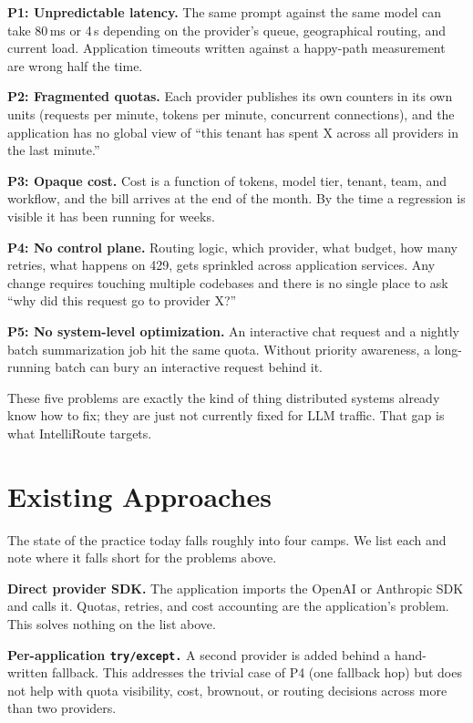 \documentclass[conference,letterpaper]{IEEEtran}
\begin{document}
\textbf{P1: Unpredictable latency.} The same prompt against the same
model can take 80\,ms or 4\,s depending on the provider's queue,
geographical routing, and current load. Application timeouts written
against a happy-path measurement are wrong half the time.

\textbf{P2: Fragmented quotas.} Each provider publishes its own
counters in its own units (requests per minute, tokens per minute,
concurrent connections), and the application has no global view of
``this tenant has spent X across all providers in the last minute.''

\textbf{P3: Opaque cost.} Cost is a function of tokens, model tier,
tenant, team, and workflow, and the bill arrives at the end of the
month. By the time a regression is visible it has been running for
weeks.

\textbf{P4: No control plane.} Routing logic, which provider, what
budget, how many retries, what happens on 429, gets sprinkled
across application services. Any change requires touching multiple
codebases and there is no single place to ask ``why did this
request go to provider X?''

\textbf{P5: No system-level optimization.} An interactive chat
request and a nightly batch summarization job hit the same quota.
Without priority awareness, a long-running batch can bury an
interactive request behind it.

These five problems are exactly the kind of thing distributed
systems already know how to fix; they are just not currently fixed
for LLM traffic. That gap is what IntelliRoute targets.

\section{Existing Approaches}\label{sec:related}
The state of the practice today falls roughly into four camps. We
list each and note where it falls short for the problems above.

\textbf{Direct provider SDK.} The application imports the OpenAI or
Anthropic SDK and calls it. Quotas, retries, and cost accounting are
the application's problem. This solves nothing on the list above.

\textbf{Per-application \texttt{try/except.}} A second provider is
added behind a hand-written fallback. This addresses the trivial case
of P4 (one fallback hop) but does not help with quota visibility,
cost, brownout, or routing decisions across more than two providers.
\end{document}
